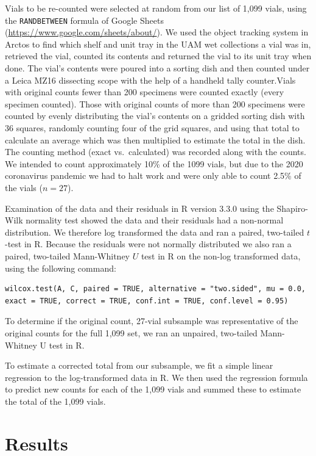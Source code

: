 \begin{multicols}{2}
Vials to be re-counted were selected at random from our list of 1,099 vials, using the \texttt{RANDBETWEEN} formula of Google Sheets (\url{https://www.google.com/sheets/about/}). We used the object tracking system in Arctos to find which shelf and unit tray in the UAM wet collections a vial was in, retrieved the vial, counted its contents and returned the vial to its unit tray when done. The vial’s contents were poured into a sorting dish and then counted under a Leica MZ16 dissecting scope with the help of a handheld tally counter.Vials with original counts fewer than 200 specimens were counted exactly (every specimen counted). Those with original counts of more than 200 specimens were counted by evenly distributing the vial's contents on a gridded sorting dish with 36 squares, randomly counting four of the grid squares, and using that total to calculate an average which was then multiplied to estimate the total in the dish. The counting method (exact vs.\ calculated) was recorded along with the counts. We intended to count approximately 10\% of the 1099 vials, but due to the 2020 coronavirus pandemic we had to halt work and were only able to count 2.5\% of the vials ($n=27$).
  
Examination of the data and their residuals in R version 3.3.0 \citep{RCoreTeam2016} using the Shapiro-Wilk normality test showed the data and their residuals had a non-normal distribution. We therefore log transformed the data and ran a paired, two-tailed $t$-test in R. Because the residuals were not normally distributed we also ran a paired, two-tailed Mann-Whitney $U$ test in R on the non-log transformed data, using the following command: 

\begin{Verbatim}[breaklines=true]
wilcox.test(A, C, paired = TRUE, alternative = "two.sided", mu = 0.0, exact = TRUE, correct = TRUE, conf.int = TRUE, conf.level = 0.95)
\end{Verbatim}

To determine if the original count, 27-vial subsample was representative of the original counts for the full 1,099 set, we ran an unpaired, two-tailed Mann-Whitney U test in R. 

To estimate a corrected total from our subsample, we fit a simple linear regression to the log-transformed data in R. We then used the regression formula to predict new counts for each of the 1,099 vials and summed these to estimate the total of the 1,099 vials.

\section{Results} 


\end{multicols}
